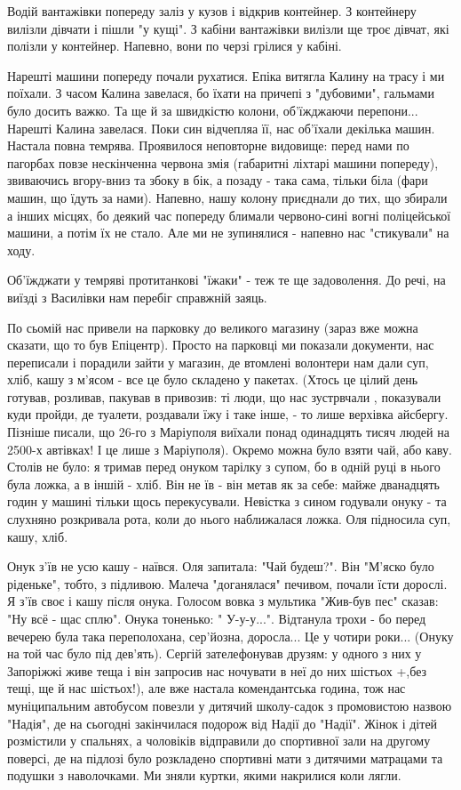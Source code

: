 Водій вантажівки попереду заліз у кузов і відкрив контейнер. З контейнеру
вилізли дівчати і пішли "у кущі". З кабіни вантажівки вилізли ще троє дівчат,
які полізли у контейнер. Напевно, вони по черзі грілися у кабіні.

Нарешті машини попереду почали рухатися. Епіка витягла Калину на трасу і ми
поїхали. З часом Калина завелася, бо їхати на причепі з "дубовими", гальмами
було досить важко. Та ще й за швидкістю колони, об'їжджаючи перепони... Нарешті
Калина завелася. Поки син відчепляа  її, нас об'їхали декілька машин. Настала
повна темрява. Проявилося неповторне видовище: перед нами по пагорбах повзе
нескінченна червона змія (габаритні ліхтарі машини попереду), звиваючись
вгору-вниз та збоку в бік, а позаду - така сама, тільки біла (фари машин, що
їдуть за нами). Напевно, нашу колону приєднали до тих, що збирали а інших
місцях, бо деякий час попереду блимали червоно-сині вогні поліцейської машини,
а потім їх не стало. Але ми не зупинялися - напевно нас "стикували" на ходу.

Об'їжджати у темряві протитанкові "їжаки" - теж те ще задоволення. До речі, на
виїзді з Василівки нам перебіг справжній заяць.

По сьомій нас привели на парковку до великого магазину (зараз вже можна
сказати, що то був Епіцентр). Просто на парковці ми показали документи, нас
переписали і порадили зайти у магазин, де втомлені волонтери нам дали суп,
хліб, кашу з м'ясом - все це було складено у пакетах. (Хтось це цілий день
готував, розливав, пакував в привозив: ті люди, що нас зустрвчали , показували
куди пройди, де туалети, роздавали їжу і таке інше, - то лише верхівка
айсбергу. Пізніше писали, що 26-го з Маріуполя виїхали понад одинадцять тисяч
людей на 2500-х автівках! І це лише з Маріуполя).  Окремо можна було взяти чай,
або каву. Столів не було: я тримав перед онуком тарілку з супом, бо в одній
руці в нього була ложка, а в іншій - хліб. Він не їв - він метав як за себе:
майже дванадцять годин у машині тільки щось перекусували. Невістка з сином
годували онуку - та слухняно розкривала рота, коли до нього наближалася ложка.
Оля підносила суп, кашу, хліб.

Онук з'їв не усю кашу - наївся. Оля запитала: "Чай будеш?". Він "М'яско було
ріденьке", тобто,  з підливою. Малеча "доганялася" печивом, почали їсти
дорослі. Я з'їв своє і кашу після онука. Голосом вовка з мультика "Жив-був пес"
сказав: "Ну всё - щас сплю". Онука тоненько: " У-у-у...". Відтанула трохи - бо
перед вечерею  була така переполохана, сер'йозна, доросла... Це у чотири
роки... (Онуку на той час було під дев'ять). Сергій зателефонував друзям: у
одного з них у Запоріжжі живе теща і він запросив нас ночувати в неї до них
шістьох +,без тещі, ще й нас шістьох!), але вже настала комендантська година,
тож нас муніципальним автобусом повезли у дитячий школу-садок з промовистою
назвою "Надія", де на сьогодні закінчилася подорож від Надії до "Надії". Жінок
і дітей розмістили у спальнях, а чоловіків відправили до спортивної зали на
другому поверсі, де на підлозі було розкладено спортивні мати з дитячими
матрацами та подушки з наволочками. Ми зняли куртки, якими накрилися коли
лягли.


